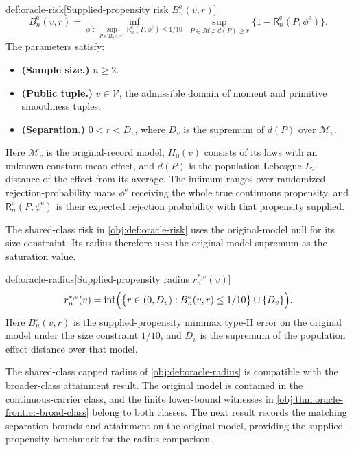 \documentclass[11pt]{article}
\begin{document}
\begin{definitionv}{def:oracle-risk}[Supplied-propensity risk $B_n^{\mathrm e}(v,r)$]
\[
B_n^{\mathrm e}(v,r)=
\inf_{\phi^{\mathrm e}:\ \sup_{P\in H_0(v)}
\mathsf R_n^{\mathrm e}(P,\phi^{\mathrm e})\le 1/10}
\ \sup_{P\in\mathcal M_v:\ d(P)\ge r}
\bigl\{1-\mathsf R_n^{\mathrm e}(P,\phi^{\mathrm e})\bigr\}.
\]
The parameters satisfy:
\begin{itemize}
\item \textbf{(Sample size.)} \(n\ge 2\).
\item \textbf{(Public tuple.)} \(v\in\mathcal V\), the admissible domain of moment and primitive smoothness tuples.
\item \textbf{(Separation.)} \(0<r<D_v\), where \(D_v\) is the supremum of \(d(P)\) over \(\mathcal M_v\).
\end{itemize}
Here \(\mathcal M_v\) is the original-record model, \(H_0(v)\) consists of its laws with an unknown constant mean effect, and \(d(P)\) is the population Lebesgue \(L_2\) distance of the effect from its average. The infimum ranges over randomized rejection-probability maps \(\phi^{\mathrm e}\) receiving the whole true continuous propensity, and \(\mathsf R_n^{\mathrm e}(P,\phi^{\mathrm e})\) is their expected rejection probability with that propensity supplied.
\end{definitionv}

The shared-class risk  in \cref{obj:def:oracle-risk} uses the original-model null for its size constraint. Its radius therefore uses the original-model supremum as the saturation value.

\begin{definitionv}{def:oracle-radius}[Supplied-propensity radius $r_n^{*,\mathrm e}(v)$]
\[
r_n^{*,\mathrm e}(v)=
\inf\Bigl(
\bigl\{r\in(0,D_v):B_n^{\mathrm e}(v,r)\le 1/10\bigr\}
\cup\{D_v\}
\Bigr).
\]
Here \(B_n^{\mathrm e}(v,r)\) is the supplied-propensity minimax type-II error on the original model under the size constraint \(1/10\), and \(D_v\) is the supremum of the population effect distance over that model.
\end{definitionv}

The shared-class capped radius  of \cref{obj:def:oracle-radius} is compatible with the broader-class attainment result. The original model is contained in the continuous-carrier class, and the finite lower-bound witnesses in \cref{obj:thm:oracle-frontier-broad-class} belong to both classes. The next result records the matching separation bounds and attainment on the original model, providing the supplied-propensity benchmark for the radius comparison.
\end{document}
